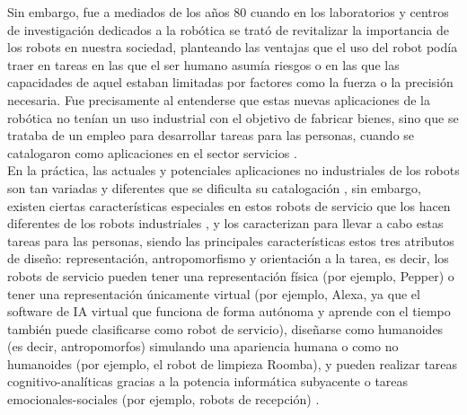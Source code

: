   \pagebreak
   
Sin embargo, fue a mediados de los años 80 cuando en los laboratorios y centros de investigación dedicados a la robótica se trató de revitalizar la importancia de los robots en nuestra sociedad, planteando las ventajas que el uso del robot podía traer en tareas en las que el ser humano asumía riesgos o en las que las capacidades de aquel estaban limitadas por factores como la fuerza o la precisión necesaria. Fue precisamente al entenderse que estas nuevas aplicaciones de la robótica no tenían un uso industrial con el objetivo de fabricar bienes, sino que se trataba de un empleo para desarrollar tareas para las personas, cuando se catalogaron como aplicaciones en el sector servicios \cite{Barrientos02}.\\

En la práctica, las actuales y potenciales aplicaciones no industriales de los robots son tan variadas y diferentes que se dificulta su catalogación \cite{Barrientos02}, sin embargo, existen ciertas características especiales en estos robots de servicio que los hacen diferentes de los robots industriales \cite{Aracil08}, y los caracterizan para llevar a cabo estas tareas para las personas, siendo las principales características estos tres atributos de diseño: representación, antropomorfismo y orientación a la tarea, es decir, los robots de servicio pueden tener una representación física (por ejemplo, Pepper) o tener una representación únicamente virtual (por ejemplo, Alexa, ya que el software de IA virtual que funciona de forma autónoma y aprende con el tiempo también puede clasificarse como robot de servicio), diseñarse como humanoides (es decir, antropomorfos) simulando una apariencia humana o como no humanoides (por ejemplo, el robot de limpieza Roomba), y pueden realizar tareas cognitivo-analíticas gracias a la potencia informática subyacente o tareas emocionales-sociales (por ejemplo, robots de recepción) \cite{Wirtz18}.\\

